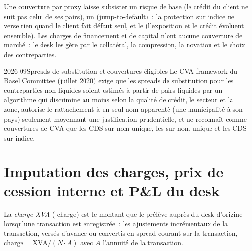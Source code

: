 Une couverture par proxy laisse subsister un risque de base (le crédit du client ne suit pas celui de ses pairs),
un  (jump-to-default)~: la protection sur indice ne verse rien quand le client fait défaut seul, et
le  (l'exposition et le crédit évoluent ensemble). Les charges de financement et de capital n'ont
aucune couverture de marché~: le desk les gère par le collatéral, la compression, la novation et le choix des
contreparties.

\begin{dated}{2026-09}{Spreads de substitution et couvertures éligibles}\label{dat:rc:the-valuation-adjustment-desk:proxy}
Le CVA framework du Basel Committee (juillet 2020) exige que les spreads de substitution pour les
contreparties non liquides soient estimés à partir de pairs liquides par un algorithme qui discrimine au moins
selon la qualité de crédit, le secteur et la zone, autorise le rattachement à un seul nom apparenté (une municipalité
à son pays) seulement moyennant une justification prudentielle, et ne reconnaît comme couvertures de CVA que
les CDS sur nom unique, les  sur nom unique et les CDS sur indice.
\end{dated}

\section{Imputation des charges, prix de cession interne et P\&L du desk}

\begin{definition}\label{def:rc:the-valuation-adjustment-desk:charge}
La \emph{charge XVA} ( charge) est le montant que le  prélève auprès du
desk d'origine lorsqu'une transaction est enregistrée~: les ajustements  incrémentaux de la transaction, versés d'avance ou
convertis en spread courant sur la transaction, $\text{charge} = \mathrm{XVA}/(N\cdot A)$ avec $A$
l'annuité de la transaction.
\end{definition}

